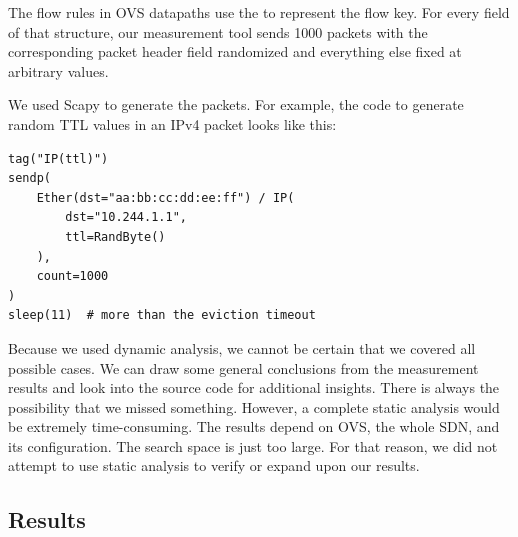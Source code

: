 The flow rules in OVS datapaths use the \href{https://elixir.bootlin.com/linux/v6.2.15/source/net/openvswitch/flow.h\#L75}{} to represent the flow key. For every field of that structure, our measurement tool sends 1000 packets with the corresponding packet header field randomized and everything else fixed at arbitrary values.

We used Scapy to generate the packets. For example, the code to generate random TTL values in an IPv4 packet looks like this:


\begin{verbatim}
tag("IP(ttl)")
sendp(
    Ether(dst="aa:bb:cc:dd:ee:ff") / IP(
        dst="10.244.1.1",
        ttl=RandByte()
    ),
    count=1000
)
sleep(11)  # more than the eviction timeout
\end{verbatim}

Because we used dynamic analysis, we cannot be certain that we covered all possible cases. We can draw some general conclusions from the measurement results and look into the source code for additional insights. There is always the possibility that we missed something. However, a complete static analysis would be extremely time-consuming. The results depend on OVS, the whole SDN, and its configuration. The search space is just too large. For that reason, we did not attempt to use static analysis to verify or expand upon our results.

\subsection{Results}
\label{res:upcall-generators}

